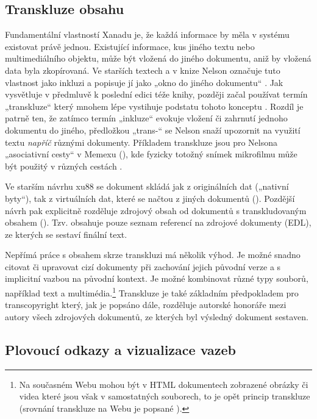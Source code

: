 \subsection{Transkluze obsahu}
\label{sec:xanafeat:translc}

Fundamentální vlastností Xanadu je, že každá informace by měla v systému existovat právě jednou. Existující informace, kus jiného textu nebo multimediálního objektu, může být vložená do jiného dokumentu, aniž by vložená data byla zkopírovaná. Ve starších textech a v knize  Nelson označuje tuto vlastnost jako inkluzi a popisuje jí jako „okno do jiného dokumentu“ \autocite[2/32]{LitMachines}. Jak vysvětluje v předmluvě k poslední edici téže knihy, později začal používat termín „transkluze“ který mnohem lépe vystihuje podstatu tohoto konceptu \autocite[Preface to the 1993 Edition]{LitMachines}. Rozdíl je patrně ten, že zatímco termín „inkluze“ evokuje vložení či zahrnutí jednoho dokumentu do jiného, předložkou „trans-“ se Nelson snaží upozornit na využití textu \emph{napříč} různými dokumenty. Příkladem transkluze jsou pro Nelsona „asociativní cesty“ v Memexu (), kde fyzicky totožný snímek mikrofilmu může být použitý v různých cestách \autocite{Nelson:XanaduSpace}.

Ve starším návrhu xu88 se dokument skládá jak z originálních dat („nativní byty“), tak z virtuálních dat, které se načtou z jiných dokumentů (). Pozdější návrh  pak explicitně rozděluje zdrojový obsah od dokumentů s transkludovaným obsahem (). Tzv.  obsahuje pouze seznam referencí na zdrojové dokumenty (EDL), ze kterých se sestaví finální text.

Nepřímá práce s obsahem skrze transkluzi má několik výhod. Je možné snadno citovat či upravovat cizí dokumenty při zachování jejich původní verze a s implicitní vazbou na původní kontext. Je možné kombinovat různé typy souborů, například text a multimédia.\footnote{Na současném Webu mohou být v HTML dokumentech zobrazené obrázky či videa které jsou však v samostatných souborech, to je opět princip transkluze (srovnání transkluze na Webu je popsané ).}
Transkluze je také základním předpokladem pro transcopyright který, jak je popsáno dále, rozděluje autorské honoráře mezi autory všech zdrojových dokumentů, ze kterých byl výsledný dokument sestaven.

\subsection{Plovoucí odkazy a vizualizace vazeb}

